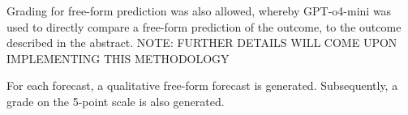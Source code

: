 \documentclass[12pt,a4paper]{article}
\newcommand{\ifdev}[1]{%
  \IfStrEq{\DICT}{development}{#1}{}%
}
\begin{document}
Grading for free-form prediction was also allowed, whereby GPT-o4-mini was used to directly compare a free-form prediction of the outcome, to the outcome described in the abstract. NOTE: FURTHER DETAILS WILL COME UPON IMPLEMENTING THIS METHODOLOGY %


For each forecast, a qualitative free-form forecast is generated. Subsequently, a grade on the 5-point scale is also generated.



\end{document}
